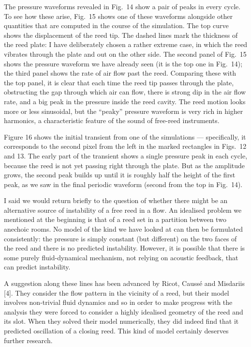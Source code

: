   The pressure waveforms revealed in Fig.\ 14 show a pair of peaks in every 
  cycle. To see how these arise, Fig.\ 15 shows one of these waveforms 
  alongside other quantities that are computed in the course of the simulation. 
  The top curve shows the displacement of the reed tip. The dashed lines mark 
  the thickness of the reed plate: I have deliberately chosen a rather extreme 
  case, in which the reed vibrates through the plate and out on the other side. 
  The second panel of Fig.\ 15 shows the pressure waveform we have already seen 
  (it is the top one in Fig.\ 14); the third panel shows the rate of air flow 
  past the reed. Comparing these with the top panel, it is clear that each time 
  the reed tip passes through the plate, obstructing the gap through which air 
  can flow, there is strong dip in the air flow rate, and a big peak in the 
  pressure inside the reed cavity. The reed motion looks more or less 
  sinusoidal, but the ``peaky'' pressure waveform is very rich in higher 
  harmonics, a characteristic feature of the sound of free-reed instruments. 

  Figure 16 shows the initial transient from one of the simulations — 
  specifically, it corresponds to the second pixel from the left in the marked 
  rectangles in Figs.\ 12 and 13. The early part of the transient shows a 
  single pressure peak in each cycle, because the reed is not yet passing right 
  through the plate. But as the amplitude grows, the second peak builds up 
  until it is roughly half the height of the first peak, as we saw in the final 
  periodic waveform (second from the top in Fig.\ 14). 

  I said we would return briefly to the question of whether there might be an 
  alternative source of instability of a free reed in a flow. An idealised 
  problem we mentioned at the beginning is that of a reed set in a partition 
  between two anechoic rooms. No model of the kind we have looked at can then 
  be formulated consistently: the pressure is simply constant (but different) 
  on the two faces of the reed and there is no predicted instability. However, 
  it is possible that there is some purely fluid-dynamical mechanism, not 
  relying on acoustic feedback, that can predict instability. 

  A suggestion along these lines has been advanced by Ricot, Caussé and 
  Misdariis [4]. They consider the flow pattern in the vicinity of a reed, but 
  their model involves non-trivial fluid dynamics and so in order to make 
  progress with the analysis they were forced to consider a highly idealised 
  geometry of the reed and its slot. When they solved their model numerically, 
  they did indeed find that it predicted oscillation of a closing reed. This 
  kind of model certainly deserves further research. 

